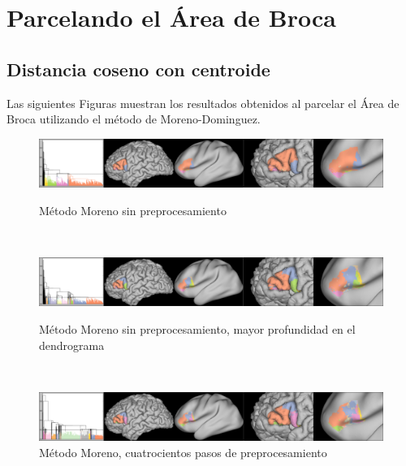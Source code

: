 \section{Parcelando el \'Area de Broca}

\subsection{Distancia coseno con centroide}

Las siguientes Figuras muestran los resultados obtenidos al parcelar el \'Area
de Broca utilizando el m\'etodo de Moreno-Dominguez.

\begin{figure}[h!]
                                                                                                                        
\begin{minipage}[b]{\textwidth}
    \includegraphics[width=\textwidth]{img/broca/moreno_0.png}
    \caption{M\'etodo Moreno sin preprocesamiento}

\end{minipage} ~
                                                                                                                       
\begin{minipage}[b]{\textwidth}
    \includegraphics[width=\textwidth]{img/broca/moreno_0_deep.png}
    \caption{M\'etodo Moreno sin preprocesamiento, mayor profundidad en el 
            dendrograma}

\end{minipage} ~

\begin{minipage}[b]{\textwidth}
    \includegraphics[width=\textwidth]{img/broca/moreno_400.png}
    \caption{M\'etodo Moreno, cuatrocientos pasos de preprocesamiento}


\end{minipage}
\end{figure}
